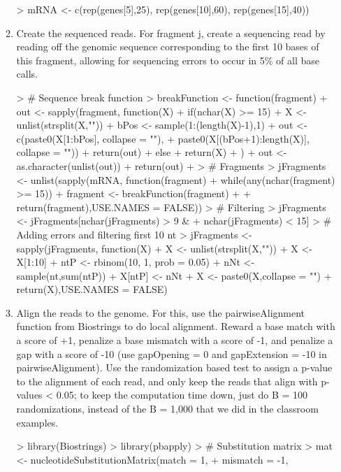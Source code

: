 \documentclass[12pt,a4paper]{paper}
\begin{document}
\begin{enumerate}
\begin{enumerate}
\begin{Schunk}
\begin{Sinput}
> mRNA <- c(rep(genes[5],25), rep(genes[10],60), rep(genes[15],40))
\end{Sinput}
\end{Schunk}
\item Create the sequenced reads. For fragment j, create a sequencing read by reading off
the genomic sequence corresponding to the first 10 bases of this fragment, allowing for
sequencing errors to occur in 5\% of all base calls.
\begin{Schunk}
\begin{Sinput}
> # Sequence break function
> breakFunction <- function(fragment){
+   out <- sapply(fragment, function(X){
+     if(nchar(X) >= 15){
+       X <- unlist(strsplit(X,""))
+       bPos <- sample(1:(length(X)-1),1)
+       out <- c(paste0(X[1:bPos], collapse = ""),
+                paste0(X[(bPos+1):length(X)], collapse = ""))
+       return(out)
+     } else {
+       return(X)
+     }})
+   out <- as.character(unlist(out))
+   return(out)
+ }
> # Fragments 
> jFragments <- unlist(sapply(mRNA, function(fragment){
+   while(any(nchar(fragment) >= 15)) {
+     fragment <- breakFunction(fragment)
+   }
+   return(fragment)},USE.NAMES = FALSE))
> # Filtering
> jFragments <- jFragments[nchar(jFragments) > 9 & 
+                            nchar(jFragments) < 15]
> # Adding errors and filtering first 10 nt
> jFragments <- sapply(jFragments, function(X){
+   X <- unlist(strsplit(X,""))
+   X <- X[1:10]
+   ntP <- rbinom(10, 1, prob = 0.05)
+   nNt <- sample(nt,sum(ntP))
+   X[ntP] <- nNt
+   X <- paste0(X,collapse = "")
+   return(X)},USE.NAMES = FALSE)
\end{Sinput}
\end{Schunk}
\item Align the reads to the genome. For this, use the pairwiseAlignment function from
Biostrings to do local alignment. Reward a base match with a score of +1, penalize a
base mismatch with a score of -1, and penalize a gap with a score of -10 (use gapOpening
= 0 and gapExtension = -10 in pairwiseAlignment). Use the randomization based test
to assign a p-value to the alignment of each read, and only keep the reads that align with
p-values < 0.05; to keep the computation time down, just do B = 100 randomizations,
instead of the B = 1,000 that we did in the classroom examples.
\begin{Schunk}
\begin{Sinput}
> library(Biostrings)
> library(pbapply)
> # Substitution matrix
> mat <- nucleotideSubstitutionMatrix(match = 1, 
+                                     mismatch = -1, 

\end{Sinput}
\end{Schunk}
\end{enumerate}
\end{enumerate}
\end{document}
